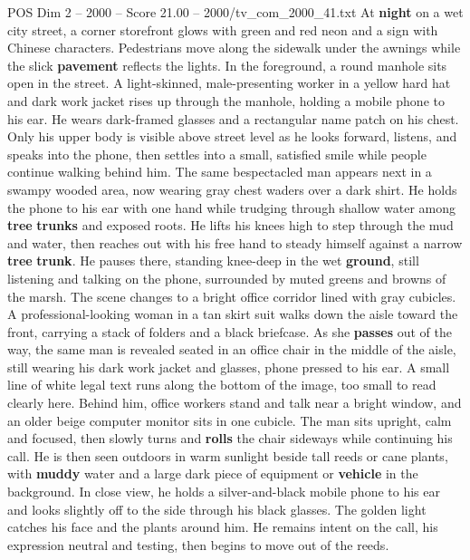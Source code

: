 \begin{textsample}{POS Dim 2 – 2000 – Score 21.00 – 2000/tv\_com\_2000\_41.txt}  \label{ex:f2_pos_026}
At \textbf{night} on a wet city street, a corner storefront glows with green and red neon and a sign with Chinese characters.
Pedestrians move along the sidewalk under the awnings while the slick \textbf{pavement} reflects the lights.
In the foreground, a round manhole sits open in the street.
A light-skinned, male-presenting worker in a yellow hard hat and dark work jacket rises up through the manhole, holding a mobile phone to his ear.
He wears dark-framed glasses and a rectangular name patch on his chest.
Only his upper body is visible above street level as he looks forward, listens, and speaks into the phone, then settles into a small, satisfied smile while people continue walking behind him.
The same bespectacled man appears next in a swampy wooded area, now wearing gray chest waders over a dark shirt.
He holds the phone to his ear with one hand while trudging through shallow water among \textbf{tree} \textbf{trunks} and exposed roots.
He lifts his knees high to step through the mud and water, then reaches out with his free hand to steady himself against a narrow \textbf{tree} \textbf{trunk}.
He pauses there, standing knee-deep in the wet \textbf{ground}, still listening and talking on the phone, surrounded by muted greens and browns of the marsh.
The scene changes to a bright office corridor lined with gray cubicles.
A professional-looking woman in a tan skirt suit walks down the aisle toward the front, carrying a stack of folders and a black briefcase.
As she \textbf{passes} out of the way, the same man is revealed seated in an office chair in the middle of the aisle, still wearing his dark work jacket and glasses, phone pressed to his ear.
A small line of white legal text runs along the bottom of the image, too small to read clearly here.
Behind him, office workers stand and talk near a bright window, and an older beige computer monitor sits in one cubicle.
The man sits upright, calm and focused, then slowly turns and \textbf{rolls} the chair sideways while continuing his call.
He is then seen outdoors in warm sunlight beside tall reeds or cane plants, with \textbf{muddy} water and a large dark piece of equipment or \textbf{vehicle} in the background.
In close view, he holds a silver-and-black mobile phone to his ear and looks slightly off to the side through his black glasses.
The golden light catches his face and the plants around him.
He remains intent on the call, his expression neutral and testing, then begins to move out of the reeds.

\end{textsample}
